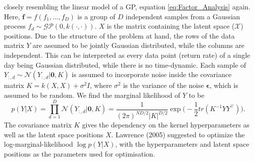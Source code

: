 closely resembling the linear model of a GP, equation \ref{eq:Factor_Analysis} again. Here, $\bm{f} = f(f_1,...,f_D)$ is a group of $D$ independent samples from a Gaussian process $f_d \sim \mathcal{GP}(0, k(\cdot,\cdot))$. $X$ is the matrix containing the latent space ($\mathcal{X}$) positions.  Due to the structure of the problem at hand, the rows of the data matrix $Y$ are assumed to be jointly Gaussian distributed, while the columns are independent. This can be interpreted as every data point (return rate) of a single day being Gaussian distributed, while there is no time-dynamic. Each sample of $Y_{:,d} \sim \mathcal{N}(Y_{:,d}|\bm{0}, K)$ is assumed to incorporate noise inside the covariance matrix $K = k(X,X) + \sigma^2 I$, where $\sigma^2$ is the variance of the noise $\bm{\epsilon}$, which is assumed to be random. We find the marginal likelihood of $Y$ to be
\begin{equation}%
	p(Y|X) = \prod_{d=1}^{D} \mathcal{N}(Y_{:,d}|\bm{0},K) = \frac{1}{(2\pi)^{ND/2}|K|^{D/2}} \exp \Bigg(-\frac{1}{2}tr(K^{-1}YY^{\top})\Bigg).
\label{eq: marginal likelihood of data gplvm}
\end{equation}
The covariance matrix $K$ gives the dependency on the kernel hyperparameters as well as the latent space positions $X$. Lawrence (2005) suggested to optimize the log-marginal-likelihood $\log p(Y|X)$, with the hyperparameters and latent space positions as the parameters used for optimisation. 